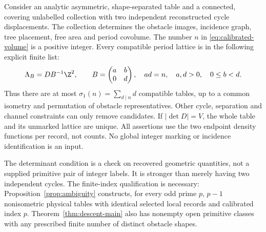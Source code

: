 \begin{theorem}\label{thm:descent-main}
Consider an analytic asymmetric, shape-separated table and a connected,
covering unlabelled collection with two independent reconstructed cycle
displacements. The collection determines the obstacle images, incidence
graph, tree placement, free area and period covolume. The number $n$
in \eqref{eq:calibrated-volume} is a positive integer. Every compatible
period lattice is in the following explicit finite list:
\begin{equation}\label{eq:hnf-main}
 \Lambda_B=DB^{-1}\Z^2,\qquad
 B=\begin{pmatrix}a&b\\0&d\end{pmatrix},\quad
 ad=n,\quad a,d>0,\quad 0\le b<d.
\end{equation}
Thus there are at most $\sigma_1(n)=\sum_{d\mid n}d$ compatible tables,
up to a common isometry and permutation of obstacle representatives.
Other cycle, separation and channel constraints can only remove candidates.
If $|\det D|=V$, the whole table and its unmarked lattice are unique.
All assertions use the two endpoint density functions per record, not
counts. No global integer marking or incidence identification is an input.
\end{theorem}

The determinant condition is a check on recovered geometric quantities,
not a supplied primitive pair of integer labels. It is stronger than
merely having two independent cycles. The finite-index qualification is
necessary: Proposition~\ref{prop:ambiguity} constructs, for every odd
prime $p$, $p-1$ nonisometric physical tables with identical selected
local records and calibrated index $p$. Theorem~\ref{thm:descent-main}
also has nonempty open primitive classes with any prescribed finite
number of distinct obstacle shapes.

